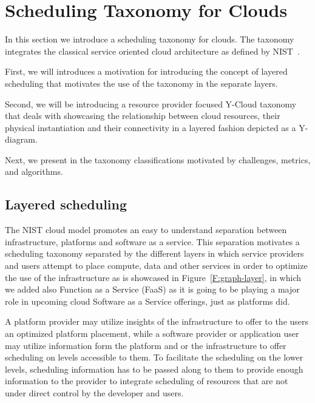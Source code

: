 \documentclass[final,5p,times,twocolumn]{elsarticle}
\begin{document}
\section{Scheduling Taxonomy for Clouds}\label{sec:taxonomy}

In this section we introduce a scheduling taxonomy for clouds. The
taxonomy integrates the classical service oriented cloud architecture
as defined by NIST~\cite{mell2011nist}. 

First, we will introduces a motivation for introducing the concept of layered
scheduling that motivates the use of the taxonomy in the separate
layers.

Second, we will be introducing a resource provider focused Y-Cloud
taxonomy that deals with showcasing the relationship between 
cloud resources, their physical instantiation and their connectivity
in a layered fashion depicted as a Y-diagram.

Next, we present in the taxonomy classifications motivated by
challenges, metrics, and algorithms.


\subsection{Layered scheduling}

The NIST cloud model promotes an easy to understand separation between
infrastructure, platforms and software as a service. This separation
motivates a scheduling taxonomy separated by the different layers in
which service providers and users attempt to place compute, data and
other services in order to optimize the use of the infrastructure as
is showcased in Figure~\ref{F:graph-layer}, in which we added also
Function as a Service (FaaS) as it is going to be playing a major role
in upcoming cloud Software as a Service offerings, just as platforms
did.






A platform provider may utilize insights of the infrastructure to
offer to the users an optimized platform placement, while a software
provider or application user may utilize information form the platform
and or the infrastructure to offer scheduling on levels accessible to
them. To facilitate the scheduling on the lower levels, scheduling
information has to be passed along to them to provide enough
information to the provider to integrate scheduling of resources that
are not under direct control by the developer and users.
\end{document}
